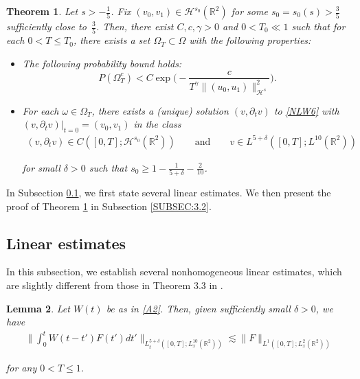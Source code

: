 \documentclass[letterpaper, 11pt,  reqno]{amsart}
\newtheorem{theorem}{Theorem} [section]
\newtheorem{lemma}[theorem]{Lemma}
\newcommand{\1}{\hspace{0.5mm}\text{I}\hspace{0.2mm}}
\newcommand{\noi}{\noindent}
\newcommand{\R}{\mathbb{R}}
\newcommand{\dl}{\delta}
\newcommand{\eps}{\varepsilon}
\newcommand{\g}{\gamma}
\newcommand{\dt}{\partial_t}
\renewcommand{\o}{\omega}
\renewcommand{\O}{\Omega}
\newcommand{\les}{\lesssim}
\renewcommand{\H}{\mathcal{H}}
\numberwithin{equation}{section}
\numberwithin{theorem}{section}
\begin{document}
\begin{theorem}\label{THM:LWP2}
Let $s > -\frac 15$.
Fix $(v_0, v_1) \in \H^{s_0}(\R^2)$
for some $s_0 = s_0(s) > \frac 35$ sufficiently close to~$\frac 35$.
Then, 
there exist $ C, c, \g>0$ and  $0 < T_0 \ll1 $ such that
for each $0< T \le T_0$,
there exists a set $\O_T \subset \O$ with the following properties:

\smallskip
\begin{itemize}
\item[\textup{(i)}] The following probability bound holds:
\begin{equation}\label{probbound1}
\displaystyle P(\O_T^c) < C \exp\bigg(-\frac{c}{T^\g \|(u_0, u_1)\|_{\H^s}^2 }\bigg).
\end{equation}

\medskip

\item[\textup{(ii)}]
For each $\o \in \O_T$, there exists a \textup{(}unique\textup{)} 
solution $(v, \dt v)$ 
to \eqref{NLW6}
with $(v, \dt v) |_{t = 0} = (v_0, v_1)$
in the class 
\begin{align}
 (v, \dt v) \in C([0,  T]; \H^{s_0} (\R^2))
\qquad \text{and}\qquad 
v\in  L^{5+\dl}([0, T];  L^{10}(\R^2))
\label{class1}
\end{align}

\noi
for small $\dl> 0$ such that $s_0 \geq  1 - \frac 1{5+\dl} - \frac 2{10}$.

\end{itemize}



\end{theorem}



In Subsection \ref{SUBSEC:3.1}, 
we first state several linear estimates.
We then present the proof of Theorem \ref{THM:LWP2}
in Subsection \ref{SUBSEC:3.2}. 


\subsection{Linear estimates}
\label{SUBSEC:3.1}




In this subsection,  we establish several nonhomogeneous
linear estimates, which are slightly different from 
those in Theorem 3.3 in \cite{KC}.

\begin{lemma}\label{LEM:lin1}
Let $W(t)$ be as in \eqref{A2}.
Then, given sufficiently small $\dl > 0$, we have 
\begin{align}
\bigg\|\int_0^t W(t - t')F(t') dt'\bigg\|_{L^{5+\dl }_t([0, T];  L^{10}_x(\R^2))}
\les \|F\|_{L^1([0, T]; L^2_x(\R^2))}
\label{lin1}
\end{align}


\noi
for any $0 < T \leq 1$.

\end{lemma}
\end{document}
